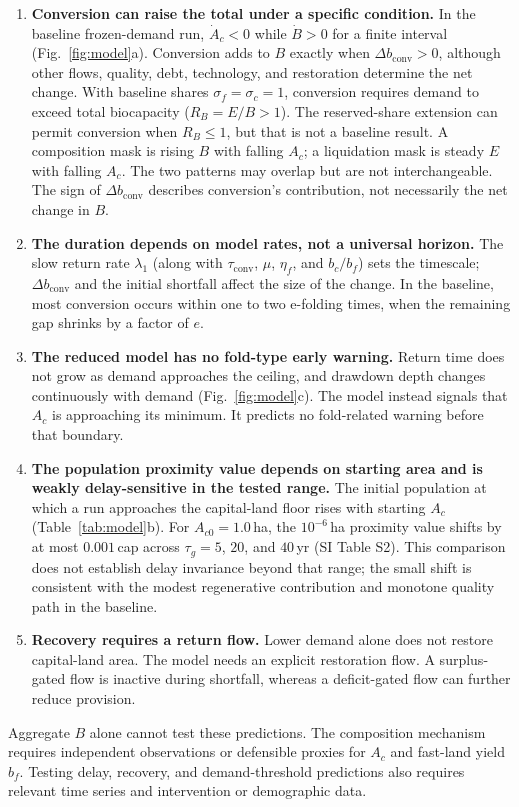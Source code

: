 \documentclass[preprint,12pt,authoryear]{elsarticle}
\newcommand{\dconv}{\Delta b_{\mathrm{conv}}}
\newcommand{\tconv}{\tau_{\mathrm{conv}}}
\begin{document}
\begin{enumerate}[label=P\arabic*.,leftmargin=2.2em]
\item \textbf{Conversion can raise the total under a specific condition.} In the baseline frozen-demand run, $\dot A_c<0$ while $\dot B>0$ for a finite interval (Fig.~\ref{fig:model}a). Conversion adds to $B$ exactly when $\dconv>0$, although other flows, quality, debt, technology, and restoration determine the net change. With baseline shares $\sigma_f=\sigma_c=1$, conversion requires demand to exceed total biocapacity ($R_B=E/B>1$). The reserved-share extension can permit conversion when $R_B\le1$, but that is not a baseline result. A composition mask is rising $B$ with falling $A_c$; a liquidation mask is steady $E$ with falling $A_c$. The two patterns may overlap but are not interchangeable. The sign of $\dconv$ describes conversion's contribution, not necessarily the net change in $B$.
\item \textbf{The duration depends on model rates, not a universal horizon.} The slow return rate $\lambda_1$ (along with $\tconv$, $\mu$, $\eta_f$, and $b_c/b_f$) sets the timescale; $\dconv$ and the initial shortfall affect the size of the change. In the baseline, most conversion occurs within one to two e-folding times, when the remaining gap shrinks by a factor of $e$.
\item \textbf{The reduced model has no fold-type early warning.} Return time does not grow as demand approaches the ceiling, and drawdown depth changes continuously with demand (Fig.~\ref{fig:model}c). The model instead signals that $A_c$ is approaching its minimum. It predicts no fold-related warning before that boundary.
\item \textbf{The population proximity value depends on starting area and is weakly delay-sensitive in the tested range.} The initial population at which a run approaches the capital-land floor rises with starting $A_c$ (Table~\ref{tab:model}b). For $A_{c0}=1.0$\,ha, the $10^{-6}$\,ha proximity value shifts by at most $0.001$\,cap across $\tau_g=5$, $20$, and $40$\,yr (SI Table S2). This comparison does not establish delay invariance beyond that range; the small shift is consistent with the modest regenerative contribution and monotone quality path in the baseline.
\item \textbf{Recovery requires a return flow.} Lower demand alone does not restore capital-land area. The model needs an explicit restoration flow. A surplus-gated flow is inactive during shortfall, whereas a deficit-gated flow can further reduce provision.
\end{enumerate}
Aggregate $B$ alone cannot test these predictions. The composition mechanism requires independent observations or defensible proxies for $A_c$ and fast-land yield $b_f$. Testing delay, recovery, and demand-threshold predictions also requires relevant time series and intervention or demographic data.
\clearpage
\end{document}
